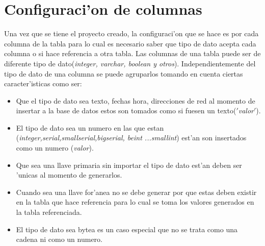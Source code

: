 \section{Configuraci'on de columnas}
Una vez que se tiene el proyecto creado, la configuraci'on que se hace es por cada columna de la tabla para lo cual es necesario saber que tipo de dato acepta cada columna o si hace referencia a otra tabla.
Las columnas de una tabla puede ser de diferente tipo de dato(\textit{integer, varchar, boolean y otros}). Independientemente del tipo de dato de una columna se puede agruparlos tomando en cuenta ciertas caracter'isticas como ser:
\begin{itemize}
\item Que el tipo de dato sea texto, fechas hora, direcciones de red al momento de insertar a la base de datos estos son tomados como si fuesen un texto($'$\textit{valor}$'$).
\item El tipo de dato sea un numero en las que estan (\textit{integer,serial,smallserial,bigserial, beint ...smallint}) est'an son insertados como un numero (\textit{valor}).
\item Que sea una llave primaria sin importar el tipo de dato est'an deben ser 'unicas al momento de generarlos.
\item Cuando sea una llave for'anea no se debe generar por que estas deben existir en la tabla que hace referencia para lo cual se toma los valores generados en la tabla referenciada.
\item El tipo de dato sea bytea es un caso especial que no se trata como una cadena ni como un numero.
\end{itemize}
